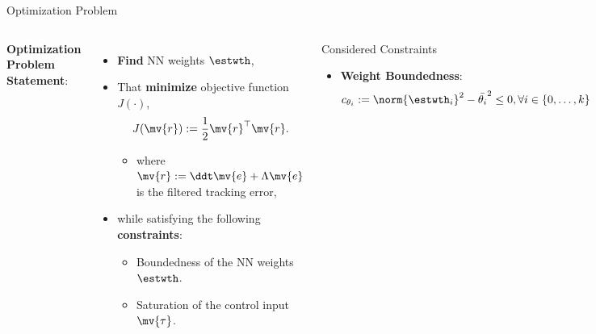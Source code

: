 \documentclass[8pt, aspectratio=169]{beamer}
\begin{document}
\begin{frame}{\insertsubsectionhead}{Optimization Problem}

\begin{columns}


    \textbf{Optimization Problem Statement}:

    \begin{itemize}
      \item \textbf{Find} NN weights $\estwth$,
      \item That \textbf{minimize} objective function $J(\cdot)$,
        \begin{equation}
          J(\mv{r}) := \frac{1}{2} \mv{r}^\top \mv{r}.
        \end{equation}
        \begin{itemize}
          \item where $\mv{r} := \ddt\mv{e} + \Lambda\mv{e}$ is the filtered tracking error,
        \end{itemize}
      \item while satisfying the following \textbf{constraints}:
        \begin{itemize}
          \item Boundedness of the NN weights $\estwth$.
          \item Saturation of the control input $\mv{\tau}$.
        \end{itemize}
    \end{itemize}

  

    \begin{block}{Considered Constraints}

      \begin{itemize}
        \item \textbf{Weight Boundedness}: 
          \begin{equation}
            c_{\theta_i}
            :=
            \norm{\estwth_i}^2 - \bar{\theta_i}^2 \le 0
            , 
            \forall i\in\{0,\ldots,k\}
          \end{equation}


\end{itemize}
\end{block}
\end{columns}
\end{frame}
\end{document}
